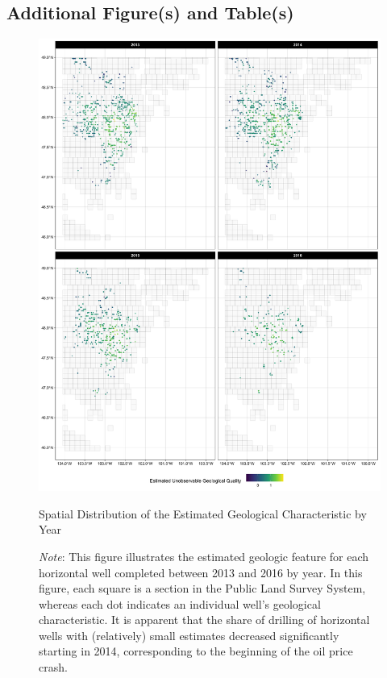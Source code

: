 \subsection{Additional Figure(s) and Table(s)}
\label{C3-Appendix_Additional-Figures-and-Tables}
    \begin{figure}[ht!]
        \centering
        \includegraphics[scale = 0.105]{04_Chapter-3/00A_Figures/Figure_Cross-Sectional-Approach_Estimates-from-Robinson-Estimator_Spatial-Distribution-of-Unobservable-Geological-Quality.png}
        \caption{Spatial Distribution of the Estimated Geological Characteristic by Year}
        \caption*{
        	{\small
            \textit{Note}: 
            This figure illustrates the estimated geologic feature for each horizontal well completed between 2013 and 2016 by year. In this figure, each square is a section in the Public Land Survey System, whereas each dot indicates an individual well's geological characteristic. It is apparent that the share of drilling of horizontal wells with (relatively) small estimates decreased significantly starting in 2014, corresponding to the beginning of the oil price crash.
        }}
        \label{Figure:Spatial-Distribution-of-the-Estimated-Geological-Characteristic-by-Year}
    \end{figure}

